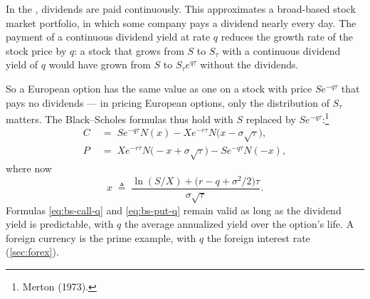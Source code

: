 
In the , dividends are paid continuously.
This approximates a broad-based stock market portfolio, in which some company pays a dividend nearly every day.
The payment of a continuous dividend yield at rate $q$ reduces the growth rate of the stock price by $q$: a stock that grows from $S$ to $S_{\tau}$ with a continuous dividend yield of $q$ would have grown from $S$ to $S_{\tau}e^{q\tau}$ without the dividends.

\suppstart
{}
\suppend

So a European option has the same value as one on a stock with price $Se^{-q\tau}$ that pays no dividends --- in pricing European options, only the distribution of $S_{\tau}$ matters.
The Black--Scholes formulas thus hold with $S$ replaced by $Se^{-q\tau}$:\footnote{Merton (1973).}
\begin{align}
	C & \;=\; Se^{-q\tau}N(x)-Xe^{-r\tau}N\bigl(x-\sigma\sqrt{\tau}\bigr) , \label{eq:bs-call-q} \\
	P & \;=\; Xe^{-r\tau}N\bigl(-x+\sigma\sqrt{\tau}\bigr)-Se^{-q\tau}N(-x) , \label{eq:bs-put-q}
\end{align}
where now
\begin{equation}
	x \;\triangleq\; \frac{\ln(S/X)+\bigl(r-q+\sigma^{2}/2\bigr)\tau}{\sigma\sqrt{\tau}} .
	\label{eq:bs-x-q}
\end{equation}
Formulas \eqref{eq:bs-call-q} and \eqref{eq:bs-put-q} remain valid as long as the dividend yield is predictable, with $q$ the average annualized yield over the option's life.
\suppstart
A foreign currency is the prime example, with $q$ the foreign interest rate (\autoref{sec:forex}).


